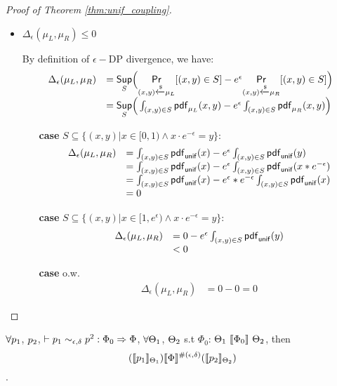 \documentclass[a4paper,11pt]{article}
\begin{document}
\begin{proof}[Proof of Theorem \ref{thm:unif_coupling}]
\begin{itemize}
	\item $\Delta_{\epsilon}(\mu_L, \mu_R) \leq 0$

	By definition of $\epsilon-$DP divergence, we have:
	 \[
	 \begin{array}{ll}
	 \Delta_{\epsilon}(\mu_L, \mu_R) 
	 & = \underset{S}{\mathsf{Sup}}
	 \Big(
	 \underset{(x,y) \xleftarrow{\$} \mu_L}{\mathsf{Pr}}[(x,y) \in S] - e^{\epsilon} \underset{(x,y) \xleftarrow{\$} \mu_R}{\mathsf{Pr}}[(x,y) \in S]
	 \Big) \\
	 & =\underset{S}{\mathsf{Sup}}
	 \Big(
	 \int_{(x,y) \in S} \mathsf{pdf}_{\mu_L}(x, y) - e^{\epsilon} \int_{(x,y) \in S} \mathsf{pdf}_{\mu_R}(x, y)
	 \Big)	 
	 \end{array}
	 \]
	 \begin{itemize}
	 	\item[{\bf case}] $S \subseteq \{(x, y) | x \in [0, 1) \land x \cdot e^{-\epsilon} = y\}$:\\
		 \[
		 \begin{array}{ll}
		 \Delta_{\epsilon}(\mu_L, \mu_R) 
		 & = 
		 \int_{(x,y) \in S} \mathsf{pdf}_{\mathsf{unif}}(x) - e^{\epsilon} \int_{(x,y) \in S} \mathsf{pdf}_{\mathsf{unif}}(y)\\
		 & = 
		 \int_{(x,y) \in S} \mathsf{pdf}_{\mathsf{unif}}(x) - e^{\epsilon} \int_{(x,y) \in S} \mathsf{pdf}_{\mathsf{unif}}(x * e^{-\epsilon})\\ 
		 & = 
		 \int_{(x,y) \in S} \mathsf{pdf}_{\mathsf{unif}}(x) - e^{\epsilon}* e^{-\epsilon} \int_{(x,y) \in S} \mathsf{pdf}_{\mathsf{unif}}(x )\\
		 & = 0 
		 \end{array}
		 \]
	 	\item[{\bf case}] $S \subseteq \{(x, y) | x \in [1, e^{\epsilon}) \land x \cdot e^{-\epsilon} = y\}$:\\
		 \[
		 \begin{array}{ll}
		 \Delta_{\epsilon}(\mu_L, \mu_R) 
		 & = 
		 0 - e^{\epsilon} \int_{(x,y) \in S} \mathsf{pdf}_{\mathsf{unif}}(y)\\
		 & <  0 
		 \end{array}
		 \]
	 	\item[{\bf case}] o.w.\\
		 \[
		 \begin{array}{ll}
		 \Delta_{\epsilon}(\mu_L, \mu_R) 
		 & = 0 - 0 =  0 
		 \end{array}
		 \]	 	

	 \end{itemize}

\end{itemize}
\end{proof}
%
%
%
%
%
%
\clearpage
\begin{thm}[Soundness]
 $\forall p_1$, $p_2$,  $ \vdash p_1	
\sim_{\epsilon, \delta} 
p^2 :
\Phi_0 \Rightarrow \Phi $,    $\forall \Theta_1$, $\Theta_2$ 
s.t $\Phi_0$: 
$\Theta_1 ~ \llbracket \Phi_0 \rrbracket ~ \Theta_2$,
then
$$ 
(\llbracket p_1 \rrbracket_{\Theta_1})  
\llbracket \Phi \rrbracket^{\#(\epsilon, \delta)} 
(\llbracket p_2 \rrbracket_{\Theta_2}) 
$$.
\end{thm}
\end{document}
